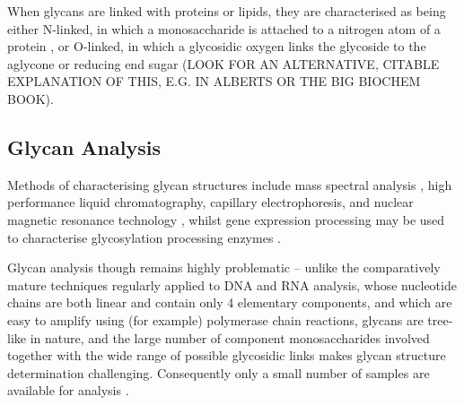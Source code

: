 \documentclass[12pt,a4paper]{article}
\begin{document}
When glycans are linked with proteins or lipids, they are characterised as being either N-linked, in which a monosaccharide is attached to a nitrogen atom of a protein \citep{taylor2011introduction}, or O-linked, in which a glycosidic oxygen links the glycoside to the aglycone or reducing end sugar (LOOK FOR AN ALTERNATIVE, CITABLE EXPLANATION OF THIS, E.G. IN ALBERTS OR THE BIG BIOCHEM BOOK).












\subsection{Glycan Analysis}
\label{sec:glycan_analysis}

Methods of characterising glycan structures include mass spectral analysis \citep{10.1371/journal.pcbi.1002813}, high performance liquid chromatography, capillary electrophoresis, and nuclear magnetic resonance technology \citep{von2004bioinformatics}, whilst gene expression processing may be used to characterise glycosylation processing enzymes \citep{10.1371/journal.pcbi.1002813}.

Glycan analysis though remains highly problematic -- unlike the comparatively mature techniques regularly applied to DNA and RNA analysis, whose nucleotide chains are both linear and contain only 4 elementary components, and which are easy to amplify using (for example) polymerase chain reactions, glycans are tree-like in nature, and the large number of component monosaccharides involved together with the wide range of possible glycosidic links makes glycan structure determination challenging. Consequently only a small number of samples are available for analysis \citep{doi:10.1093/bioinformatics/bti666}.
\end{document}
